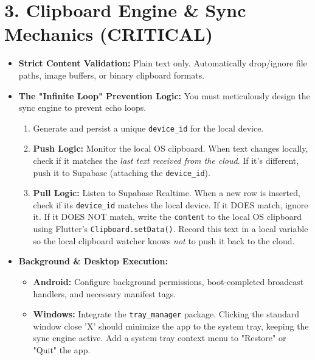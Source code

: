 \documentclass[11pt, a4paper]{article}
\begin{document}
\section*{3. Clipboard Engine \& Sync Mechanics (CRITICAL)}
\begin{itemize}
    \item \textbf{Strict Content Validation:} Plain text only. Automatically drop/ignore file paths, image buffers, or binary clipboard formats.
    \item \textbf{The "Infinite Loop" Prevention Logic:} You must meticulously design the sync engine to prevent echo loops.
    \begin{enumerate}
        \item Generate and persist a unique \texttt{device\_id} for the local device.
        \item \textbf{Push Logic:} Monitor the local OS clipboard. When text changes locally, check if it matches the \textit{last text received from the cloud}. If it's different, push it to Supabase (attaching the \texttt{device\_id}).
        \item \textbf{Pull Logic:} Listen to Supabase Realtime. When a new row is inserted, check if its \texttt{device\_id} matches the local device. If it DOES match, ignore it. If it DOES NOT match, write the \texttt{content} to the local OS clipboard using Flutter's \texttt{Clipboard.setData()}. Record this text in a local variable so the local clipboard watcher knows \textit{not} to push it back to the cloud.
    \end{enumerate}
    \item \textbf{Background \& Desktop Execution:}
    \begin{itemize}
        \item \textbf{Android:} Configure background permissions, boot-completed broadcast handlers, and necessary manifest tags.
        \item \textbf{Windows:} Integrate the \texttt{tray\_manager} package. Clicking the standard window close 'X' should minimize the app to the system tray, keeping the sync engine active. Add a system tray context menu to "Restore" or "Quit" the app.
    \end{itemize}
\end{itemize}
\end{document}
